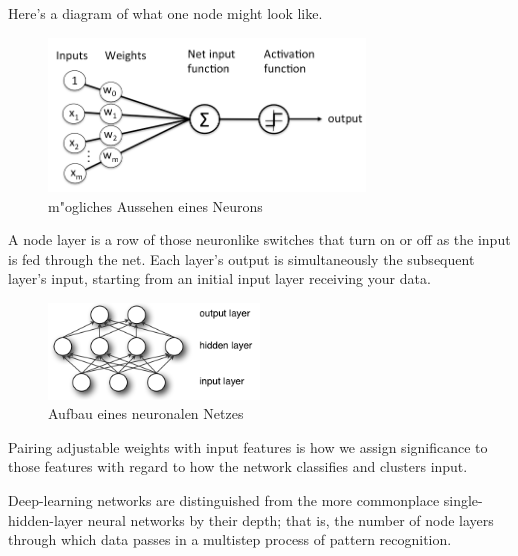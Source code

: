 {Here’s a diagram of what one node might look like.
\renewcommand{\figurename}{Abb.}
\begin{figure}[htp]
\centering
\includegraphics[width=0.75\textwidth]{pictures/perceptron_node.png}
\caption[ein Neuron]{m"ogliches Aussehen eines Neurons\protect\footnotemark}
\end{figure}

A node layer is a row of those neuronlike switches that turn on or off as the input is fed through the net. Each layer’s output is simultaneously the subsequent layer’s input, starting from an initial input layer receiving your data.
\renewcommand{\figurename}{Abb.}
\begin{figure}[htp]
\centering
\includegraphics[width=0.50\textwidth]{pictures/mlp.png}
\caption[Aufbau eines neuronalen Netzes]{Aufbau eines neuronalen Netzes\protect\footnotemark}
\end{figure}

Pairing adjustable weights with input features is how we assign significance to those features with regard to how the network classifies and clusters input.

Deep-learning networks are distinguished from the more commonplace single-hidden-layer neural networks by their depth; that is, the number of node layers through which data passes in a multistep process of pattern recognition.

}
